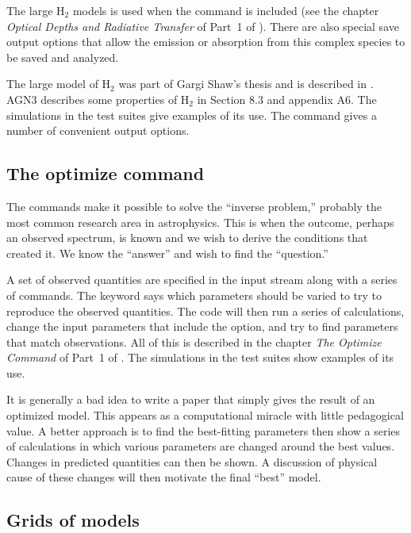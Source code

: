 \documentclass[12pt,twoside]{article}
\begin{document}
The large H$_2$ models is used when the 
command is included (see the chapter \emph{Optical Depths and Radiative Transfer}
of Part~1 of \Hazy).  There are also special save output options that allow
the emission or absorption from this complex species to be saved and analyzed.

The large model of H$_2$ was part of Gargi Shaw's thesis and is described
in \citet{Shaw2005}.
AGN3 describes some properties of H$_2$ in Section
8.3 and appendix A6.  The simulations 
in the test suites give examples
of its use.  The  command
gives a number of convenient output options.

\subsection{The optimize command}

The  commands make it
possible to solve the ``inverse problem,''
probably the most common research area in astrophysics.  This is when the
outcome, perhaps an observed spectrum, is known and we wish to derive the
conditions that created it.  We know the ``answer'' and wish to find the
``question.''

A set of observed quantities are specified in the input stream along with
a series of  commands.  The
keyword  says which parameters should
be varied to try to reproduce the observed quantities.  The code will then
run a series of calculations, change the input parameters that include the
 option, and try to find parameters
that match observations.
All of
this is described in the chapter \emph{The Optimize Command} of Part~1 of \Hazy.
The simulations  in the
test suites show examples of its use.

It is generally a bad idea to write a paper that simply gives the result
of an optimized model.  This appears as a computational miracle with little
pedagogical value.  A better approach is to find the best-fitting parameters
then show a series of calculations in which various parameters are changed
around the best values.  Changes in predicted quantities can then be shown.
A discussion of physical cause of these changes will then motivate the final
``best'' model.

\subsection{Grids of models}
\label{sec:GridsOfModels}
\end{document}
